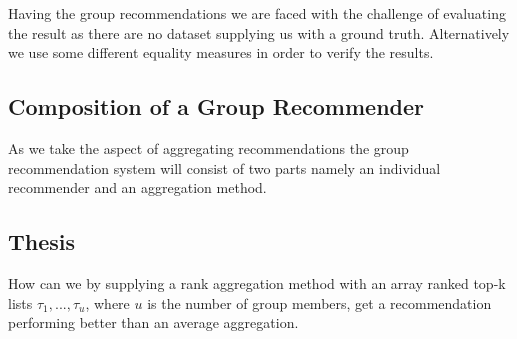 Having the group recommendations we are faced with the challenge of evaluating the result as there are no dataset supplying us with a ground truth. Alternatively we use some different equality measures in order to verify the results. 








\subsection{Composition of a Group Recommender}
As we take the aspect of aggregating recommendations the group recommendation system will consist of two parts namely an individual recommender and an aggregation method. 

\subsection{Thesis}
How can we by supplying a rank aggregation method with an array ranked top-k lists $\tau_1, ... , \tau_u$, where $u$ is the number of group members, get a recommendation performing better than an average aggregation. 


